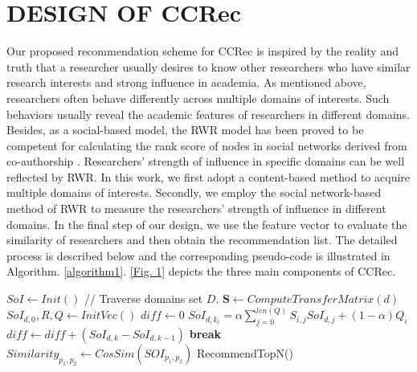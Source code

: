 \documentclass[10pt]{article}
\newcommand{\algorithmicbreak}{\textbf{break}}
\newcommand{\BREAK}{\State \algorithmicbreak}
\begin{document}
\section*{DESIGN OF CCRec}
Our proposed recommendation scheme for CCRec is inspired by the reality and truth that a researcher usually desires to know other researchers who have similar research interests and strong influence in academia. As mentioned above, researchers often behave differently across multiple domains of interests. Such behaviors usually reveal the academic features of researchers in different domains. Besides, as a social-based model, the RWR model has been proved to be competent for calculating the rank score of nodes in social networks derived from co-authorship \cite{li2014acrec}. Researchers' strength of influence in specific domains can be well reflected by RWR. In this work, we first adopt a content-based method to acquire multiple domains of interests. Secondly, we employ the social network-based method of RWR to measure the researchers' strength of influence in different domains. In the final step of our design, we use the feature vector to evaluate the similarity of researchers and then obtain the recommendation list. The detailed process is described below and the corresponding pseudo-code is illustrated in Algorithm. \ref{algorithm1}. \autoref{Fig. 1} depicts the three main components of CCRec.

\begin{algorithm}[!hbt]
  \label{algorithm1}
  \begin{algorithmic}[1]
  \State $SoI \leftarrow Init()$
   // Traverse domains set $D$.
        \State $\mathbf{S} \leftarrow ComputeTransferMatrix(d)$
        \State $SoI_{d,0}, R, Q \leftarrow InitVec()$
            \State $diff \leftarrow 0$
                \State $SoI_{d,k_{i}} = \alpha\sum_{j=0}^{len(Q)} S_{i,j}SoI_{d,j}+(1-\alpha) Q_{i}$
                \State $diff \leftarrow diff +(SoI_{d,k}-SoI_{d,k-1})$
            \EndFor
                \BREAK
            \EndIf
        \EndFor
  \EndFor
            \State $Similarity_{p_{1},p_{2}} \leftarrow CosSim(SOI_{p_{1},p_{2}})$
        \EndFor
  \EndFor
  \State RecommendTopN()
  \end{algorithmic}
\end{algorithm}
\end{document}
